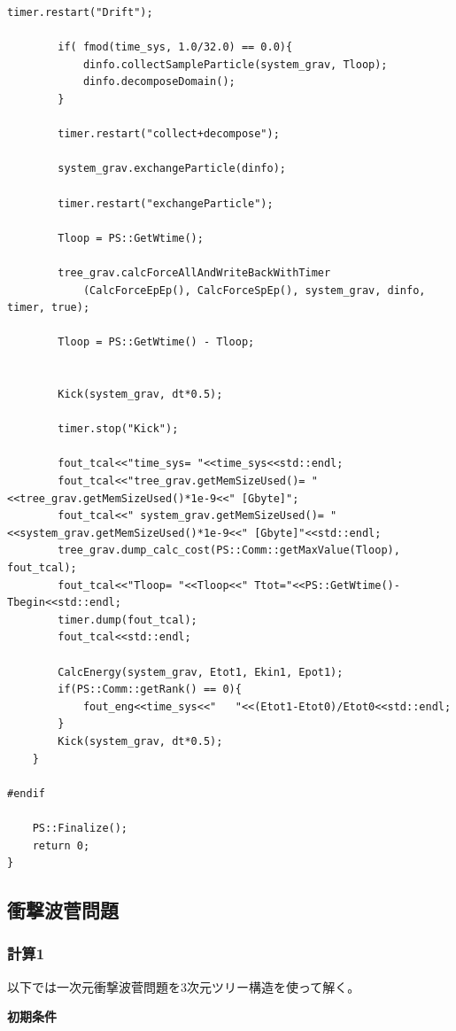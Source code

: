 \begin{lstlisting}[caption=重力$N$体計算]
        timer.restart("Drift");

        if( fmod(time_sys, 1.0/32.0) == 0.0){
            dinfo.collectSampleParticle(system_grav, Tloop);
            dinfo.decomposeDomain();
        }

        timer.restart("collect+decompose");

        system_grav.exchangeParticle(dinfo);

        timer.restart("exchangeParticle");

        Tloop = PS::GetWtime();

        tree_grav.calcForceAllAndWriteBackWithTimer
            (CalcForceEpEp(), CalcForceSpEp(), system_grav, dinfo, timer, true);

        Tloop = PS::GetWtime() - Tloop;


        Kick(system_grav, dt*0.5);

        timer.stop("Kick");

        fout_tcal<<"time_sys= "<<time_sys<<std::endl;
        fout_tcal<<"tree_grav.getMemSizeUsed()= "<<tree_grav.getMemSizeUsed()*1e-9<<" [Gbyte]";
        fout_tcal<<" system_grav.getMemSizeUsed()= "<<system_grav.getMemSizeUsed()*1e-9<<" [Gbyte]"<<std::endl;
        tree_grav.dump_calc_cost(PS::Comm::getMaxValue(Tloop), fout_tcal);
        fout_tcal<<"Tloop= "<<Tloop<<" Ttot="<<PS::GetWtime()-Tbegin<<std::endl;
        timer.dump(fout_tcal);
        fout_tcal<<std::endl;

        CalcEnergy(system_grav, Etot1, Ekin1, Epot1);
        if(PS::Comm::getRank() == 0){
            fout_eng<<time_sys<<"   "<<(Etot1-Etot0)/Etot0<<std::endl;
        }
        Kick(system_grav, dt*0.5);
    }

#endif

    PS::Finalize();
    return 0;
}
\end{lstlisting}



\subsection{衝撃波菅問題}

\subsubsection{計算1}

以下では一次元衝撃波菅問題を3次元ツリー構造を使って解く。

{\bf 初期条件}

